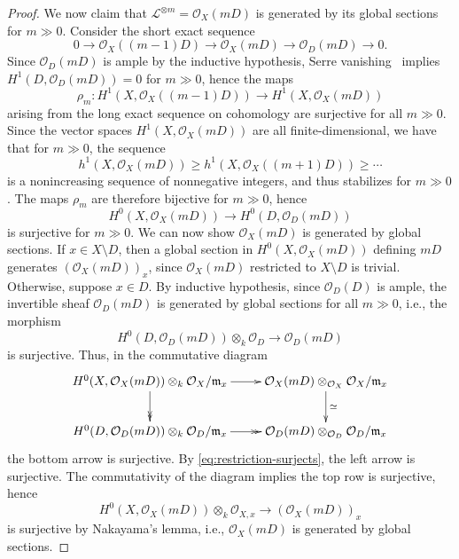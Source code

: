 \begin{proof}
We now claim that $\mathcal{L}^{\otimes m} = \mathcal{O}_X(mD)$ is generated by
its global sections for $m \gg 0$. Consider the short exact sequence
$$
0 \longrightarrow \mathcal{O}_X((m-1)D) \longrightarrow \mathcal{O}_X(mD)
\longrightarrow \mathcal{O}_D(mD) \longrightarrow 0.
$$
Since $\mathcal{O}_D(mD)$ is ample by the inductive hypothesis,
Serre vanishing~ implies
$H^1(D,\mathcal{O}_D(mD)) = 0$ for $m \gg 0$, hence the maps
$$
\rho_m : H^1(X,\mathcal{O}_X((m -1)D)) \longrightarrow H^1(X,\mathcal{O}_X(mD))
$$
arising from the long exact sequence on cohomology
are surjective for all $m \gg 0$. Since the vector spaces
$H^1(X,\mathcal{O}_X(mD))$ are all finite-dimensional, we have that for $m \gg
0$, the sequence
$$h^1(X,\mathcal{O}_X(mD)) \ge h^1(X,\mathcal{O}_X((m+1)D)) \ge \cdots$$
is a nonincreasing sequence of nonnegative integers, and thus stabilizes for $m
\gg 0$. The maps $\rho_m$ are therefore bijective for $m \gg 0$, hence
\begin{equation}\label{eq:restriction-surjects}
  H^0(X,\mathcal{O}_X(mD)) \longrightarrow H^0(D,\mathcal{O}_D(mD))
\end{equation}
is surjective for $m \gg 0$. We can now show $\mathcal{O}_X(mD)$ is generated by
global sections. If $x \in X \setminus D$, then a global section in
$H^0(X,\mathcal{O}_X(mD))$ defining $mD$ generates $(\mathcal{O}_X(mD))_x$,
since $\mathcal{O}_X(mD)$ restricted to $X \setminus D$ is trivial.
Otherwise, suppose $x \in D$. By inductive hypothesis, since $\mathcal{O}_D(D)$
is ample, the invertible sheaf $\mathcal{O}_D(mD)$ is generated by global
sections for all $m \gg 0$, i.e., the morphism
$$
H^0(D,\mathcal{O}_D(mD)) \otimes_k \mathcal{O}_D \longrightarrow
\mathcal{O}_D(mD)
$$
is surjective. Thus, in the commutative diagram
$$
\xymatrix{
  H^0(X,\mathcal{O}_X(mD)) \otimes_k \mathcal{O}_X/\mathfrak{m}_x
  \ar[r]\ar@{->>}[d] & \mathcal{O}_X(mD) \otimes_{\mathcal{O}_X}
  \mathcal{O}_X/\mathfrak{m}_x \ar[d]^\simeq\\
  H^0(D,\mathcal{O}_D(mD)) \otimes_k \mathcal{O}_D/\mathfrak{m}_x \ar@{->>}[r] &
  \mathcal{O}_D(mD) \otimes_{\mathcal{O}_D} \mathcal{O}_D/\mathfrak{m}_x
}
$$
the bottom arrow is surjective. By \eqref{eq:restriction-surjects}, the left
arrow is surjective. The commutativity of the diagram implies the top row is
surjective, hence
$$
H^0(X,\mathcal{O}_X(mD)) \otimes_k \mathcal{O}_{X,x} \longrightarrow
(\mathcal{O}_X(mD))_x
$$
is surjective by Nakayama's lemma, i.e., $\mathcal{O}_X(mD)$ is generated by
global sections.


\end{proof}

